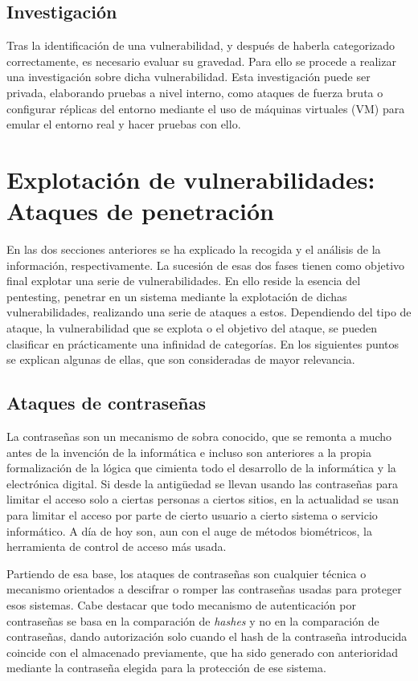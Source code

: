 \subsection{Investigación}

Tras la identificación de una vulnerabilidad, y después de haberla categorizado correctamente, es necesario evaluar su gravedad. Para ello se procede a realizar una investigación sobre dicha vulnerabilidad. Esta investigación puede ser privada, elaborando pruebas a nivel interno, como ataques de fuerza bruta o configurar réplicas del entorno mediante el uso de máquinas virtuales (VM) para emular el entorno real y hacer pruebas con ello.

\section[Explotación de vulnerabilidades]{Explotación de vulnerabilidades: Ataques de penetración}

En las dos secciones anteriores se ha explicado la recogida y el análisis de la información, respectivamente. La sucesión de esas dos fases tienen como objetivo final explotar una serie de vulnerabilidades. En ello reside la esencia del pentesting, penetrar en un sistema mediante la explotación de dichas vulnerabilidades, realizando una serie de ataques a estos. Dependiendo del tipo de ataque, la vulnerabilidad que se explota o el objetivo del ataque, se pueden clasificar en prácticamente una infinidad de categorías. En los siguientes puntos se explican algunas de ellas, que son consideradas de mayor relevancia.

\subsection{Ataques de contraseñas}
La contraseñas son un mecanismo de sobra conocido, que se remonta a mucho antes de la invención de la informática e incluso son anteriores a la propia formalización de la lógica que cimienta todo el desarrollo de la informática y la electrónica digital. Si desde la antigüedad se llevan usando las contraseñas para limitar el acceso solo a ciertas personas a ciertos sitios, en la actualidad se usan para limitar el acceso por parte de cierto usuario a cierto sistema o servicio informático. A día de hoy son, aun con el auge de métodos biométricos, la herramienta de control de acceso más usada.

Partiendo de esa base, los ataques de contraseñas son cualquier técnica o mecanismo orientados a descifrar o romper las contraseñas usadas para proteger esos sistemas. Cabe destacar que todo mecanismo de autenticación por contraseñas se basa en la comparación de \emph{hashes} y no en la comparación de contraseñas, dando autorización solo cuando el hash de la contraseña introducida coincide con el almacenado previamente, que ha sido generado con anterioridad mediante la contraseña elegida para la protección de ese sistema.

